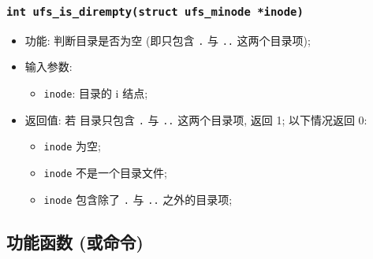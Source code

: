 \documentclass[nofonts, titlepage]{ctexart}
\begin{document}
  \subsubsection[\texttt{ufs\_is\_dirempty}]{\texttt{int ufs\_is\_dirempty(struct ufs\_minode *inode)}}

  \begin{itemize}
\item
  功能: 判断目录是否为空 (即只包含 \texttt{.} 与 \texttt{..}
  这两个目录项);
\item
  输入参数:

  \begin{itemize}
  \item
    \texttt{inode}: 目录的 i 结点;
  \end{itemize}
\item
  返回值: 若 目录只包含 \texttt{.} 与 \texttt{..} 这两个目录项, 返回 1;
  以下情况返回 0:

  \begin{itemize}
  \item
    \texttt{inode} 为空;
  \item
    \texttt{inode} 不是一个目录文件;
  \item
    \texttt{inode} 包含除了 \texttt{.} 与 \texttt{..} 之外的目录项;
  \end{itemize}
  \end{itemize}

\subsection{功能函数
(或命令)}\label{ux529fux80fdux51fdux6570-ux6216ux547dux4ee4}
\end{document}
